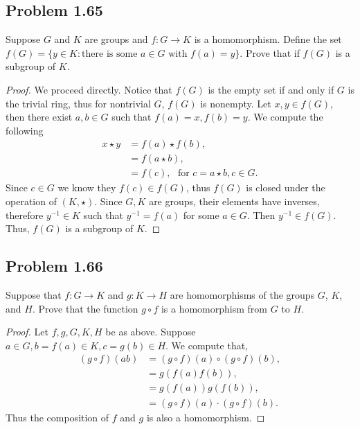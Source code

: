 \documentclass{amsbook}
\begin{document}
			\subsection*{Problem 1.65}
			\label{sub:problem_1_65}
			Suppose $G$ and $K$ are groups and $f : G \to K$ is a homomorphism. 
			Define the set $f(G) = \{ y \in K : \text{there is some $a \in G$ with $f(a) = y$} \}$.
			Prove that if $f(G)$ is a subgroup of $K$.
			\begin{proof} We proceed directly.
			Notice that $f(G)$ is the empty set if and only if $G$ is the trivial ring, thus for nontrivial $G$, $f(G)$ is nonempty.
			Let $x,y \in f(G)$, then there exist $a,b \in G$ such that $f(a) = x, f(b) = y$.
			We compute the following
				\begin{align*}
				x \star y &= f(a) \star f(b), \\
				&= f(a \star b), \\
				&= f(c), \ \ \ \text{for $c = a \star b, c \in G$.}
				\end{align*}
			Since $c \in G$ we know they $f(c) \in f(G)$, thus $f(G)$ is closed under the operation of $(K, \star)$.
			Since $G,K$ are groups, their elements have inverses, therefore $y^{-1} \in K$ such that $y^{-1} = f(a)$ for some $a \in G$.
			Then $y^{-1} \in f(G)$.
			Thus, $f(G)$ is a subgroup of $K$.
			\end{proof}

			\subsection*{Problem 1.66}
			\label{sub:problem_1_66}
			Suppose that $f : G \to K$ and $g : K \to H$ are homomorphisms of the groups $G$, $K$, and $H$. 
			Prove that the function $g \circ f$ is a homomorphism from $G$ to $H$.
			\begin{proof} Let $f,g,G,K,H$ be as above.
			Suppose $a \in G, b = f(a) \in K, c = g(b) \in H$.
			We compute that,
				\begin{align*}
				(g \circ f)(ab) &= (g \circ f)(a) \circ (g \circ f)(b), \\
				&= g\left( f(a)f(b) \right), \\
				&= g(f(a))g(f(b)), \\
				&= (g \circ f)(a) \cdot (g \circ f)(b).
				\end{align*}
			Thus the composition of $f$ and $g$ is also a homomorphism.				
			\end{proof}
\end{document}
